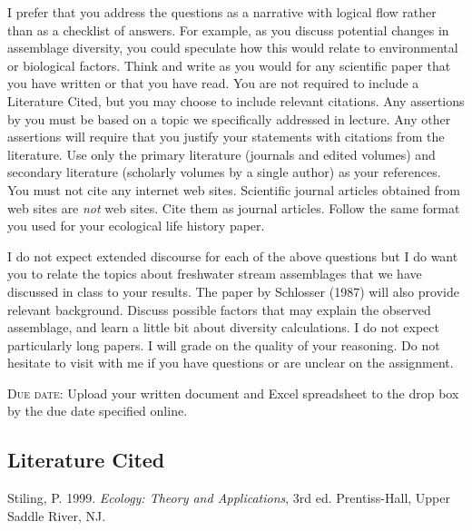 \documentclass[12pt]{article}
\begin{document}
I prefer that you address the questions as a narrative with logical flow rather than as a checklist of answers.  For example, as you discuss potential changes in assemblage diversity, you could speculate how this would relate to environmental or biological factors.  Think and write as you would for any scientific paper that you have written or that you have read.  You are not required to include a Literature Cited, but you may choose to include relevant citations.  Any assertions by you must be based on a topic we specifically addressed in lecture.  Any other assertions will require that you justify your statements with citations from the literature.  Use only the primary literature (journals and edited volumes) and secondary literature (scholarly volumes by a single author) as your references.  You must not cite any internet web sites.  Scientific journal articles obtained from web sites are \emph{not} web sites. Cite them as journal articles. Follow the same format you used for your ecological life history paper.

I do not expect extended discourse for each of the above questions but I do want you to relate the topics about freshwater stream assemblages that we have discussed in class to your results.  The paper by Schlosser (1987) will also provide relevant background.  Discuss possible factors that may explain the observed assemblage, and learn a little bit about diversity calculations.  I do not expect particularly long papers.  I will  grade on the quality of your reasoning. Do not hesitate to visit with me if you have questions or are unclear on the assignment. 


\textsc{Due date:} Upload your written document and Excel spreadsheet to the drop box by the due date specified online. 

\subsection*{Literature Cited}

Stiling, P. 1999. \textit{Ecology: Theory and Applications}, 3rd ed. Prentiss-Hall, Upper Saddle River, NJ.
\end{document}
